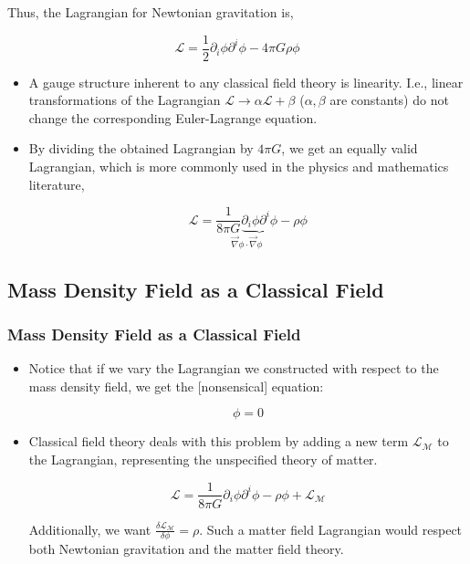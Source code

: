 \documentclass{beamer}
\begin{document}
\begin{frame}
Thus, the Lagrangian for Newtonian gravitation is,

$$\boxed{\mathcal{L} = \frac{1}{2} \partial_i \phi \partial^i \phi - 4 \pi G \rho \phi}$$
\begin{itemize}
\item A gauge structure inherent to any classical field theory is linearity. I.e., linear transformations of the Lagrangian $\mathcal{L} \to \alpha \mathcal{L} + \beta$ ($\alpha, \beta$ are constants) do not change the corresponding Euler-Lagrange equation.

\item By dividing the obtained Lagrangian by $4 \pi G$, we get an equally valid Lagrangian, which is more commonly used in the physics and mathematics literature,

$$\boxed{\mathcal{L} = \underset{\vec{\nabla} \phi \cdot \vec{\nabla} \phi}{\frac{1}{8 \pi G} \underbrace{\partial_i \phi \partial^i \phi}} - \rho \phi}$$
\end{itemize}
\end{frame}

\subsection{Mass Density Field as a Classical Field}

\begin{frame}
\frametitle{Mass Density Field as a Classical Field}

\begin{itemize}
\item Notice that if we vary the Lagrangian we constructed with respect to the mass density field, we get the [nonsensical] equation:

$$\phi = 0$$

\item Classical field theory deals with this problem by adding a new term $\mathcal{L}_\mathcal{M}$ to the Lagrangian, representing the unspecified theory of matter.

$$\boxed{\mathcal{L} = \frac{1}{8 \pi G} \partial_i \phi \partial^i \phi - \rho \phi + \mathcal{L}_\mathcal{M}}$$

Additionally, we want $\displaystyle{\frac{\delta \mathcal{L}_\mathcal{M}}{\delta \phi} = \rho}$. Such a matter field Lagrangian would respect both Newtonian gravitation and the matter field theory.
\end{itemize}
\end{frame}
\end{document}
